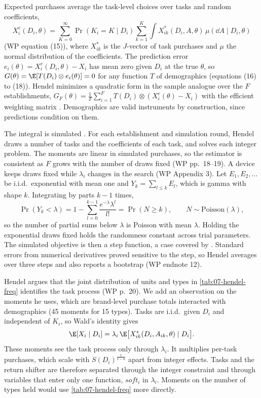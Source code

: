 Expected purchases average the task-level choices over tasks and random coefficients,
\begin{equation}\label{eq:07-hendel-expected}
X^e_i(D_i, \theta) = \sum_{K=0}^{\infty}\Pr(K_i = K \mid D_i)\sum_{k=1}^{K}\int X^*_{ik}(D_i, A, \theta)\,
\mu(\dd A \mid D_i, \theta)
\end{equation}
(WP equation (15)), where $X^*_{ik}$ is the $J$-vector of task purchases and $\mu$ the normal distribution of the
coefficients. The prediction error $e_i(\theta) = X^e_i(D_i, \theta) - X_i$ has mean zero given $D_i$ at the true
$\theta$, so $G(\theta) = \E[T(D_i)\otimes e_i(\theta)] = 0$ for any function $T$ of demographics (equations (16)
to (18)). Hendel minimizes a quadratic form in the sample analogue over the $F$ establishments, $G_F(\theta) =
\frac{1}{F}\sum_{i=1}^F T(D_i)
\otimes(X^e_i(\theta) - X_i)$ with the efficient weighting matrix \citep{Hansen1982}. Demographics are valid
instruments by construction, since predictions condition on them.

The integral is simulated \citep{McFadden1989,PakesPollard1989}. For each establishment and simulation round,
Hendel draws a number of tasks and the coefficients of each task, and solves each integer problem. The moments are
linear in simulated purchases, so the estimator is consistent as $F$ grows with the number of draws fixed (WP
pp.~18--19). A device keeps draws fixed while $\lambda_i$ changes in the search (WP Appendix 3). Let $E_1, E_2,
\dots$ be i.i.d.\ exponential with mean one and $Y_k = \sum_{l\le k}E_l$, which is gamma with shape $k$. Integrating
by parts $k-1$ times,
\begin{equation*}
\Pr(Y_k < \lambda) = 1 - \sum_{l=0}^{k-1}\frac{e^{-\lambda}\lambda^{l}}{l!} = \Pr(N \ge k),
\qquad N \sim \text{Poisson}(\lambda),
\end{equation*}
so the number of partial sums below $\lambda$ is Poisson with mean $\lambda$. Holding the exponential draws fixed
holds the randomness constant across trial parameters. The simulated objective is then a step function, a case
covered by \citet{PakesPollard1989}. Standard errors from numerical derivatives proved sensitive to the step, so
Hendel averages over three steps and also reports a bootstrap (WP endnote 12).

Hendel argues that the joint distribution of units and types in \cref{tab:07-hendel-freq} identifies the task
process (WP p.~20). We add an observation on the moments he uses, which are brand-level purchase totals interacted
with demographics (45 moments for 15 types). Tasks are i.i.d.\ given $D_i$ and independent of $K_i$, so Wald's
identity gives
\begin{equation*}
\E[X_i \mid D_i] = \lambda_i\,\E\big[X^*_{ik}(D_i, A_{ik}, \theta) \mid D_i\big].
\end{equation*}
These moments see the task process only through $\lambda_i$. It multiplies per-task purchases, which scale with
$S(D_i)^{\frac{1}{1-a}}$ apart from integer effects. Tasks and the return shifter are therefore separated through
the integer constraint and through variables that enter only one function, $soft_i$ in $\lambda_i$. Moments on the
number of types held would use \cref{tab:07-hendel-freq} more directly.

